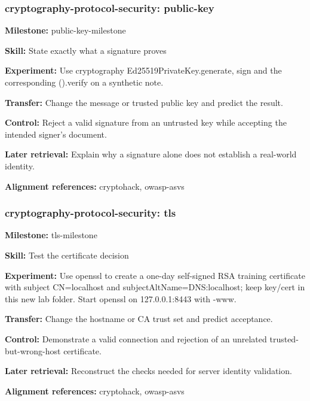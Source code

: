 \subsubsection{cryptography-protocol-security: public-key}
\noindent\textbf{Milestone:} public-key-milestone\par
\noindent\textbf{Skill:} State exactly what a signature proves\par
\noindent\textbf{Experiment:} Use cryptography Ed25519PrivateKey.generate, sign and the corresponding ().verify on a synthetic note.\par
\noindent\textbf{Transfer:} Change the message or trusted public key and predict the result.\par
\noindent\textbf{Control:} Reject a valid signature from an untrusted key while accepting the intended signer's document.\par
\noindent\textbf{Later retrieval:} Explain why a signature alone does not establish a real-world identity.\par
\noindent\textbf{Alignment references:} cryptohack, owasp-asvs\par
\subsubsection{cryptography-protocol-security: tls}
\noindent\textbf{Milestone:} tls-milestone\par
\noindent\textbf{Skill:} Test the certificate decision\par
\noindent\textbf{Experiment:} Use openssl to create a one-day self-signed RSA training certificate with subject CN=localhost and subjectAltName=DNS:localhost; keep key/cert in this new lab folder. Start openssl  on 127.0.0.1:8443 with -www.\par
\noindent\textbf{Transfer:} Change the hostname or CA trust set and predict acceptance.\par
\noindent\textbf{Control:} Demonstrate a valid connection and rejection of an unrelated trusted-but-wrong-host certificate.\par
\noindent\textbf{Later retrieval:} Reconstruct the checks needed for server identity validation.\par
\noindent\textbf{Alignment references:} cryptohack, owasp-asvs\par
